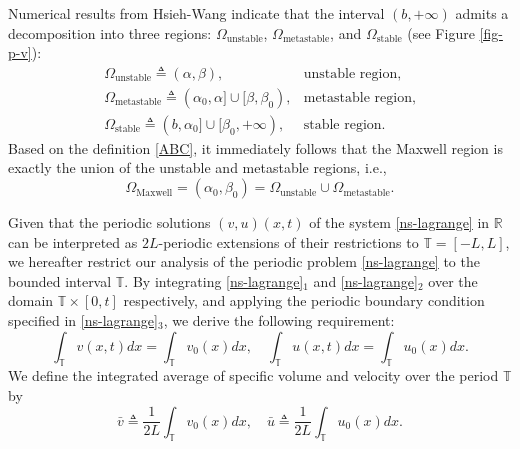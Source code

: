 \documentclass[a4paper,oneside,11pt]{article}
\numberwithin{equation}{section}
\begin{document}
Numerical results from Hsieh-Wang \cite{HW1997} indicate that the interval $(b, +\infty)$ admits a decomposition into three regions: $\Omega_{\mathrm{unstable}}$, $\Omega_{\mathrm{metastable}}$, and $\Omega_{\mathrm{stable}}$ (see Figure \ref{fig-p-v}):
\begin{equation}\label{ABC}
\left.\begin{array}{llll}
\displaystyle \Omega_{\mathrm{unstable}}\triangleq(\alpha,\beta), & \text{unstable region},\\
\displaystyle \Omega_{\mathrm{metastable}}\triangleq(\alpha_0,\alpha]\cup[\beta,\beta_0),& \text{metastable region},\\
\displaystyle \Omega_{\mathrm{stable}}\triangleq(b,\alpha_0]\cup[\beta_0,+\infty),& \text{stable region}.
\end{array}\right.
\end{equation}
Based on the definition \eqref{ABC}, it immediately follows that the Maxwell region is exactly the union of the unstable and metastable regions, i.e.,
\begin{equation}\label{Maxwell region and unstable metastable}
  \Omega_{\mathrm{Maxwell}}=(\alpha_0,\beta_0)=\Omega_{\mathrm{unstable}}\cup \Omega_{\mathrm{metastable}}.
\end{equation}


Given that the periodic solutions $(v, u)(x, t)$ of the system \eqref{ns-lagrange} in 
$\mathbb{R}$ can be interpreted as $2L$-periodic extensions of their restrictions to \(\mathbb{T}=[-L,L]\), we hereafter restrict our analysis of the periodic problem \eqref{ns-lagrange} to the bounded interval $\mathbb{T}$. By integrating \eqref{ns-lagrange}$_1$ and  \eqref{ns-lagrange}$_2$ over the domain $\mathbb{T}\times[0,t]$ respectively,  and applying the periodic boundary condition specified in \eqref{ns-lagrange}$_3$, we derive the following requirement:
\begin{equation}\label{Hypo-0}
	\int_{\mathbb{T}}v(x,t)dx=\int_{\mathbb{T}}v_0(x)dx,\quad \int_{\mathbb{T}}u(x,t)dx=\int_{\mathbb{T}}u_0(x)dx.
\end{equation}
We define the integrated average of specific volume and velocity over the period $\mathbb{T}$ by
\begin{equation}\label{Hypo-1}
	\bar{v}\triangleq\frac{1}{2L}\int_{\mathbb{T}}v_0(x)dx,\quad
	\bar{u}\triangleq\frac{1}{2L}\int_{\mathbb{T}}u_0(x)dx.
\end{equation}
\end{document}

